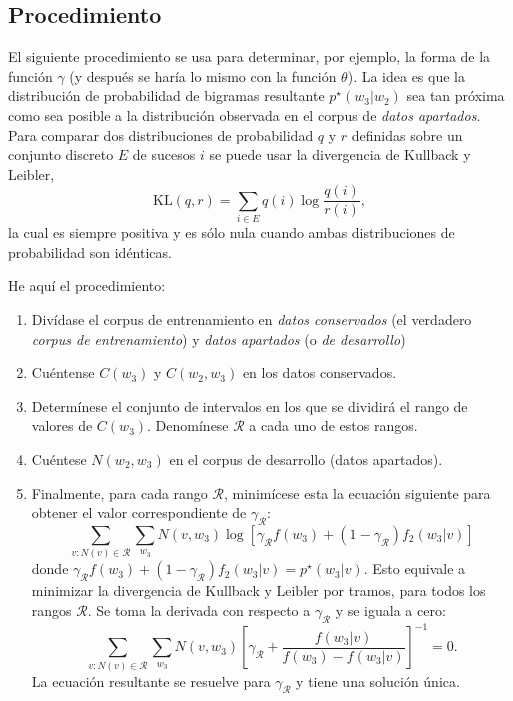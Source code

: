 \documentclass[12pt,a4paper]{article} \usepackage[spanish]{babel}
\begin{document}
\subsection{Procedimiento}
El siguiente procedimiento se usa para determinar, por ejemplo, la forma de la función \(\gamma\) (y después se haría lo mismo con la función \(\theta\)). La idea es que la distribución de probabilidad de bigramas resultante \(p^\star(w_3|w_2)\) sea tan próxima como sea posible a la distribución observada en el corpus de \emph{datos apartados}. Para comparar dos distribuciones de probabilidad  \(q\) y \(r\) definidas sobre un conjunto discreto \(E\) de sucesos \(i\) se puede usar la divergencia de Kullback y Leibler,
\begin{equation}
  \label{eq:KL}
  \mathrm{KL}(q,r)=\sum_{i\in E}q(i)\log\frac{q(i)}{r(i)},
\end{equation}
la cual es siempre positiva y es sólo nula cuando ambas distribuciones de probabilidad son idénticas. 

He aquí el procedimiento:
\begin{enumerate}
\item Divídase el corpus de entrenamiento en \emph{datos conservados} (el verdadero \emph{corpus de entrenamiento}) y \emph{datos apartados} (o \emph{de desarrollo})
\item Cuéntense \(C(w_3)\) y \(C(w_2,w_3)\) en los datos conservados.
\item Determínese el conjunto de intervalos en los que se dividirá el rango de valores de  \(C(w_3)\). Denomínese  \(\mathcal{R}\) a cada uno de estos rangos.
\item Cuéntese \(N(w_2,w_3)\) en el corpus de desarrollo (datos apartados).
\item Finalmente, para cada rango \(\mathcal{R}\), minimícese esta la ecuación siguiente para obtener el valor correspondiente de \(\gamma_\mathcal{R}\):
  \begin{equation}
    \label{eq:klrank}
    \sum_{v:N(v)\in \mathcal{R}} \sum_{w_3} N(v,w_3)\log \left[\gamma_\mathcal{R} f(w_3) + (1-\gamma_\mathcal{R})f_2(w_3|v)\right]
  \end{equation}
donde
\begin{math}
  \gamma_\mathcal{R} f(w_3) + (1-\gamma_\mathcal{R})f_2(w_3|v) = p^\star(w_3|v).
\end{math}
Esto equivale a minimizar la divergencia de Kullback y Leibler por tramos, para todos los rangos \(\mathcal{R}\). Se toma la derivada con respecto a \(\gamma_\mathcal{R}\) y se iguala a cero:
\begin{equation}
  \label{eq:klderiv}
    \sum_{v:N(v)\in \mathcal{R}} \sum_{w_3} N(v,w_3)  \left[\gamma_\mathcal{R} + \frac{f(w_3|v)}{f(w_3)-f(w_3|v)}\right]^{-1} = 0.
\end{equation}
La ecuación resultante se resuelve para  \(\gamma_\mathcal{R}\) y tiene una solución única.
\end{enumerate}
\end{document}
